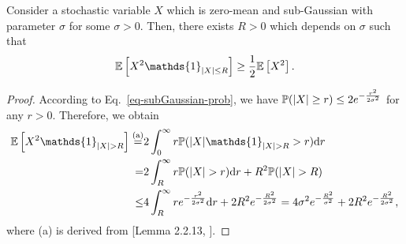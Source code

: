 \begin{lemma}\label{aux-1.1}
    Consider a stochastic variable $X$ which is zero-mean and sub-Gaussian with parameter $\sigma$ for some $\sigma>0$. Then, there exists $R>0$ which depends on $\sigma$ such that
    \begin{align}
        \bbE\left[X^2\mathds{1}_{|X|\leq R}\right]\geq\frac{1}{2}\bbE\left[X^2\right].
    \end{align}
\end{lemma}
\begin{proof}
    According to Eq.~\eqref{eq-subGaussian-prob}, we have $\mathbb{P}(|X|\geq r)\leq 2e^{-\frac{r^2}{2\sigma^2}}$ for any $r>0$. Therefore, we obtain
    \begin{align}
        \bbE\left[X^2\mathds{1}_{|X|>R}\right]\overset{\text{(a)}}{=}&2\int_{0}^{\infty}r\bbP(|X|\mathds{1}_{|X|>R}>r)\text{d}r\notag
        \\
        =&2\int_R^{\infty}r\bbP(|X|>r)\text{d}r+R^2\bbP(|X|>R)\notag
        \\
        \leq&4\int_R^{\infty}re^{-\frac{r^2}{2\sigma^2}}\text{d}r+2R^2e^{-\frac{R^2}{2\sigma^2}}=4\sigma^2e^{-\frac{R^2}{\sigma^2}}+2R^2e^{-\frac{R^2}{2\sigma^2}},
    \end{align}
    where (a) is derived from [Lemma 2.2.13, \citet{wainwright2019high}]. 
\end{proof}

